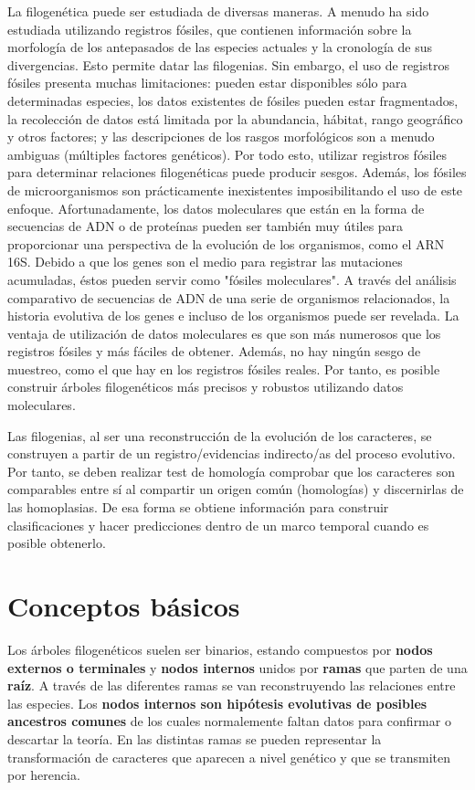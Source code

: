 La filogenética puede ser estudiada de diversas maneras. A menudo ha sido estudiada utilizando registros fósiles, que contienen información sobre la morfología de los antepasados de las especies actuales y la cronología de sus divergencias. Esto permite datar las filogenias. Sin embargo, el uso de registros fósiles presenta muchas limitaciones: pueden estar disponibles sólo para determinadas especies, los datos existentes de fósiles pueden estar fragmentados, la recolección de datos está limitada por la abundancia, hábitat, rango geográfico y otros factores; y las descripciones de los rasgos morfológicos son a menudo ambiguas (múltiples factores genéticos). Por todo esto, utilizar registros fósiles para determinar relaciones filogenéticas puede producir sesgos. Además, los fósiles de microorganismos son prácticamente inexistentes imposibilitando el uso de este enfoque. Afortunadamente, los datos moleculares que están en la forma de secuencias de ADN o de proteínas pueden ser también muy útiles para proporcionar una perspectiva de la evolución de los organismos, como el ARN 16S. Debido a que los genes son el medio para registrar las mutaciones acumuladas, éstos pueden servir como "fósiles moleculares". A través del análisis comparativo de secuencias de ADN de una serie de organismos relacionados, la historia evolutiva de los genes e incluso de los organismos puede ser revelada. La ventaja de utilización de datos moleculares es que son más numerosos que los registros fósiles y más fáciles de obtener. Además, no hay ningún sesgo de muestreo, como el que hay en los registros fósiles reales. Por tanto, es posible construir árboles filogenéticos más precisos y robustos utilizando datos moleculares. 

Las filogenias, al ser una reconstrucción de la evolución de los caracteres, se construyen a partir de un registro/evidencias indirecto/as del proceso evolutivo. Por tanto, se deben realizar test de homología comprobar que los caracteres son comparables entre sí al compartir un origen común (homologías) y discernirlas de las homoplasias. De esa forma se obtiene información para construir clasificaciones y hacer predicciones dentro de un marco temporal cuando es posible obtenerlo.

\section{Conceptos básicos}
Los árboles filogenéticos suelen ser binarios, estando compuestos por \textbf{nodos externos o terminales} y \textbf{nodos internos} unidos por \textbf{ramas} que parten de una \textbf{raíz}. A través de las diferentes ramas se van reconstruyendo las relaciones entre las especies. Los \textbf{nodos internos son hipótesis evolutivas de posibles ancestros comunes} de los cuales normalemente faltan datos para confirmar o descartar la teoría. En las distintas ramas se pueden representar la transformación de caracteres que aparecen a nivel genético y que se transmiten por herencia.  

